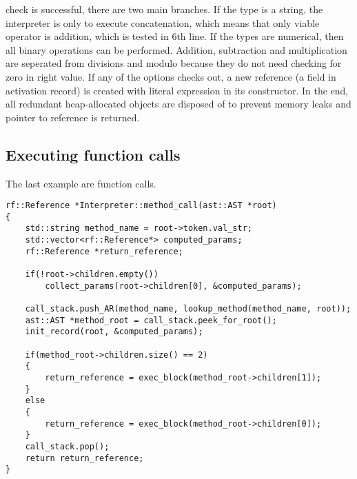 \documentclass{article}
\begin{document}
    check is successful, there are two main branches. If the type is a string, 
    the interpreter is only to execute concatenation, which means that only 
    viable operator is addition, which is tested in 6th line. If the types are 
    numerical, then all binary operations can be performed. Addition, subtraction 
    and multiplication are seperated from divisions and modulo because they do not 
    need checking for zero in right value. If any of the options checks out, a 
    new reference (a field in activation record) is created with literal expression 
    in its constructor. In the end, all redundant heap-allocated objects are 
    disposed of to prevent memory leaks and pointer to reference is returned.

\subsection{Executing function calls}

    The last example are function calls.

    \begin{verbatim}
rf::Reference *Interpreter::method_call(ast::AST *root)
{
    std::string method_name = root->token.val_str;
    std::vector<rf::Reference*> computed_params;
    rf::Reference *return_reference;

    if(!root->children.empty())
        collect_params(root->children[0], &computed_params);

    call_stack.push_AR(method_name, lookup_method(method_name, root));
    ast::AST *method_root = call_stack.peek_for_root();
    init_record(root, &computed_params);

    if(method_root->children.size() == 2)
    {
        return_reference = exec_block(method_root->children[1]);
    }
    else
    {
        return_reference = exec_block(method_root->children[0]);
    }
    call_stack.pop();
    return return_reference;
}
    \end{verbatim}
\end{document}
